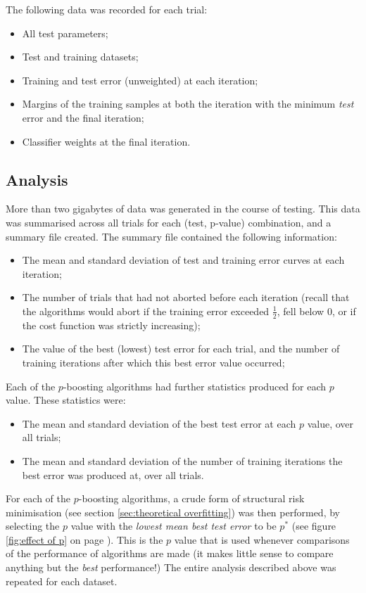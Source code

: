 The following data was recorded for each trial:
%
\begin{itemize}
\item	All test parameters;
\item	Test and training datasets;
\item	Training and test error (unweighted) at each iteration;
\item	Margins of the training samples at both the iteration with the
	minimum \emph{test} error and the final iteration;
\item	Classifier weights at the final iteration.
\end{itemize}


\subsection{Analysis}

More than two gigabytes of data was generated in the course of
testing.  This data was summarised across all trials for each (test,
p-value) combination, and a summary file created.  The summary file
contained the following information:
%
\begin{itemize}
\item	The mean and standard deviation of test and training error
	curves at each iteration;
\item	The number of trials that had not aborted before each
	iteration (recall that the algorithms would abort if the
	training error exceeded $\frac{1}{2}$, fell below $0$, or if
	the cost function was strictly increasing); 
\item	The value of the best (lowest) test error for each trial, and
	the number of training iterations after which this best error
	value occurred;
\end{itemize}
%
Each of the $p$-boosting algorithms had further statistics produced
for each $p$ value.  These statistics were:
%
\begin{itemize}
\item	The mean and standard deviation of the best test error at each
	$p$ value, over all trials;
\item	The mean and standard deviation of the number of training
	iterations the best error was produced at, over all trials.
\end{itemize}

For each of the $p$-boosting algorithms, a crude form of structural
risk minimisation (see section \ref{sec:theoretical overfitting}) was
then performed, by selecting the $p$ value with the \emph{lowest mean
best test error} to be $p^{\ast}$ (see figure \ref{fig:effect of p} on
page \pageref{fig:effect of p}).  This is the $p$ value that is used 
whenever comparisons of the performance of algorithms are made (it
makes little sense to compare anything but the \emph{best}
performance!)  The entire analysis described above was repeated for
each dataset.





